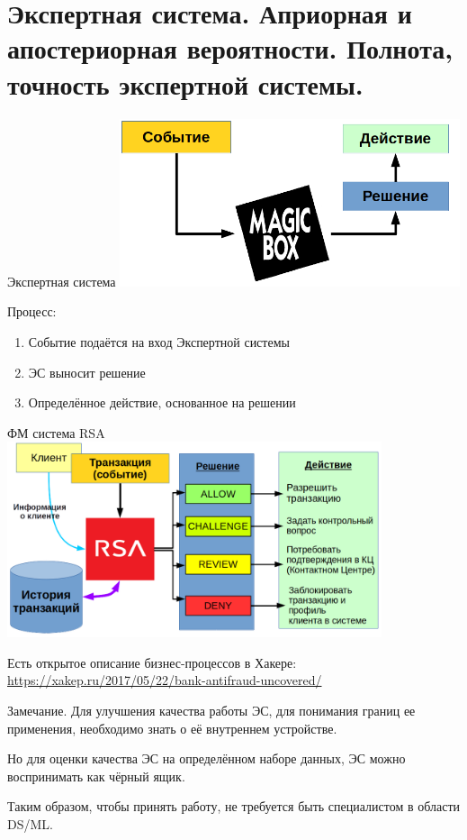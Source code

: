   \section{Экспертная система. Априорная и апостериорная вероятности. Полнота, точность экспертной системы.}\label{section:expert_systems_recall_presision}
  
  \begin{frame}{Экспертная система}
   \includegraphics[width=10cm]{../pic/expert_system_1.png}
  
  Процесс:
  \begin{enumerate}
  	\item Событие подаётся на вход Экспертной системы
  	\item ЭС выносит решение
  	\item Определённое действие, основанное на решении
  \end{enumerate}
  \end{frame}

  \begin{frame}{ФМ система RSA}
   \includegraphics[width=11cm]{../pic/expert_system_rsa.png}
  
  Есть открытое описание бизнес-процессов в Хакере:
  \url{https://xakep.ru/2017/05/22/bank-antifraud-uncovered/}
  \end{frame}
  
  \begin{frame}
  	\begin{block}{Замечание.}
  		Для улучшения качества работы ЭС, для понимания границ ее применения,
  		необходимо знать о её внутреннем устройстве.
  		
  		Но для оценки качества ЭС на определённом наборе данных, ЭС можно воспринимать как чёрный ящик.
  		
  		Таким образом, чтобы принять работу, не требуется быть специалистом в области DS/ML.
  	\end{block}
  \end{frame}




